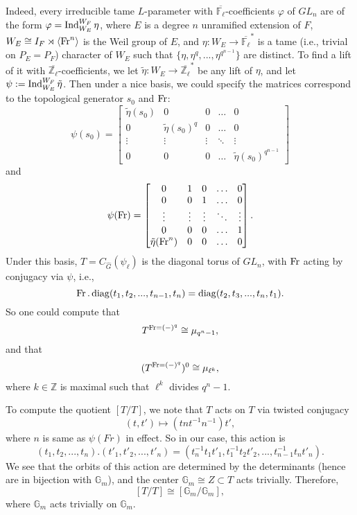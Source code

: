 Indeed, every irreducible tame $L$-parameter with $\overline{\mathbb{F}_{\ell}}$-coefficients $\varphi$ of $GL_n$ are of the form $\varphi=\operatorname{\operatorname{Ind}}_{W_E}^{W_F}\eta$, where $E$ is a degree $n$ unramified extension of $F$, $W_E \cong I_F \rtimes \left<\operatorname{Fr}^n\right>$ is the Weil group of $E$, and $\eta: W_E \to \overline{\mathbb{F}_{\ell}}^*$ is a tame (i.e., trivial on $P_E=P_F$) character of $W_E$ such that $\{\eta, \eta^q, ..., \eta^{q^{n-1}}\}$ are distinct. To find a lift of it with $\overline{\mathbb{Z}_{\ell}}$-coefficients, we let $\tilde{\eta}: W_E \to \overline{\mathbb{Z}_{\ell}}^*$ be any lift of $\eta$, and let $\psi:=\operatorname{\operatorname{Ind}}_{W_E}^{W_F}\tilde{\eta}$. Then under a nice basis, we could specify the matrices correspond to the topological generator $s_0$ and $\operatorname{Fr}$:
$$\psi(s_0)=
\begin{bmatrix}\label{Matrices}
	\tilde{\eta}(s_0) & 0                   & 0      & \dots  & 0 \\
	0                 & \tilde{\eta}(s_0)^q & 0      & \dots  & 0 \\
	\vdots            & \vdots              & \vdots & \ddots & \vdots \\
	0                 & 0                   & 0      & \dots   & \tilde{\eta}(s_0)^{q^{n-1}}
\end{bmatrix}$$
and 
$$\psi(\operatorname{Fr})=
\begin{bmatrix}
	0                   & 1      & 0      & \dots  & 0 \\
	0                   & 0      & 1      & \dots  & 0 \\
	\vdots              & \vdots & \vdots & \ddots & \vdots \\
	0                   & 0      & 0      & \dots  & 1 \\
	\tilde{\eta}(\operatorname{Fr}^n) & 0      & 0      & \dots  & 0
\end{bmatrix}
.$$
Under this basis, $T=C_{\hat{G}}(\psi_{\ell})$ is the diagonal torus of $GL_n$, with $\operatorname{Fr}$ acting by conjugacy via $\psi$, i.e., 
$$\operatorname{Fr}. \operatorname{\operatorname{diag}}(t_1, t_2, ..., t_{n-1}, t_{n}) = \operatorname{\operatorname{diag}}(t_{2}, t_{3}, ..., t_{n}, t_{1}).$$
So one could compute that 
$$T^{\operatorname{Fr}=(-)^q}\cong \mu_{q^n-1},$$
and that
$$(T^{\operatorname{Fr}=(-)^q})^0 \cong \mu_{\ell^k},$$
where $k \in \mathbb{Z}$ is maximal such that $\ell^k$ divides $q^n-1$.

To compute the quotient $[T/T]$, we note that $T$ acts on $T$ via twisted conjugacy
$$(t, t') \mapsto (tnt^{-1}n^{-1})t',$$
where $n$ is same as $\psi(Fr)$ in effect. So in our case, this action is 
$$(t_1, t_2, ..., t_n).(t'_1, t'_2, ..., t'_n)=(t_n^{-1}t_1t'_1, t_1^{-1}t_2t'_2, ..., t_{n-1}^{-1}t_nt'_n).$$ 
We see that the orbits of this action are determined by the determinants (hence are in bijection with $\mathbb{G}_m$), and the center $\mathbb{G}_m \cong Z \subset T$ acts trivially. Therefore,
$$[T/T] \cong [\mathbb{G}_m/\mathbb{G}_m],$$
where $\mathbb{G}_m$ acts trivially on $\mathbb{G}_m$.

